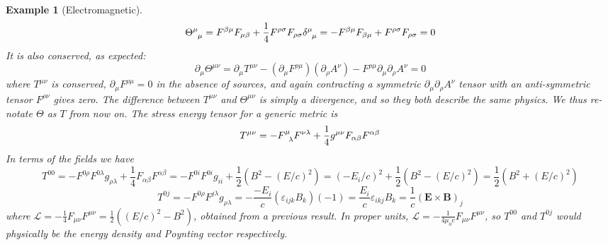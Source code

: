 \documentclass[a4paper]{article}
\newtheorem{eg}{Example}[section]
\theoremstyle{new}
\begin{document}
\begin{eg}[Electromagnetic]
$$\tensor*{\Theta}{*_{}^{\mu}_{\mu}}=F^{\beta\mu}F_{\mu\beta}+\frac{1}{4}F^{\rho\sigma}F_{\rho\sigma}\tensor*{\delta}{*_{}^{\mu}_{\mu}}=-F^{\beta\mu}F_{\beta\mu}+F^{\rho\sigma}F_{\rho\sigma}=0$$
It is also conserved, as expected:
$$\partial_\mu\Theta^{\mu\nu}=\partial_\mu T^{\mu\nu}-(\partial_\mu F^{\rho\mu})(\partial_\rho A^\nu)-F^{\rho\mu}\partial_\mu\partial_\rho A^\nu=0$$
where $T^{\mu\nu}$ is conserved, $\partial_\mu F^{\rho\mu}=0$ in the absence of sources, and again contracting a symmetric $\partial_\mu\partial_\rho A^\nu$ tensor with an anti-symmetric tensor $F^{\rho\nu}$ gives zero. The difference between $T^{\mu\nu}$ and $\Theta^{\mu\nu}$ is simply a divergence, and so they both describe the same physics. We thus re-notate $\Theta$ as $T$ from now on. The stress energy tensor for a generic metric is
$$T^{\mu\nu}=-\tensor*{F}{*_{}^{\mu}_{\lambda}}F^{\nu\lambda}+\frac{1}{4}g^{\mu\nu}F_{\alpha\beta}F^{\alpha\beta}$$
In terms of the fields we have
$$T^{00}=-F^{0\rho}F^{0\lambda}g_{\rho\lambda}+\frac{1}{4}F_{\alpha\beta}F^{\alpha\beta}=-F^{0i}F^{0i}g_{ii}+\frac{1}{2}(B^2-(E/c)^2)=(-E_i/c)^2+\frac{1}{2}(B^2-(E/c)^2)=\frac{1}{2}(B^2+(E/c)^2)$$ $$T^{0j}=-F^{0\rho}F^{j\lambda}g_{\rho\lambda}=-\frac{-E_i}{c}(\varepsilon_{ijk}B_k)(-1)=\frac{E_i}{c}\varepsilon_{ikj}B_k=\frac{1}{c}(\mathbf{E}\times\mathbf{B})_j$$
where $\mathcal{L}=-\frac{1}{4}F_{\mu\nu}F^{\mu\nu}=\frac{1}{2}((E/c)^2-B^2)$, obtained from a previous result. In proper units, $\mathcal{L}=-\frac{1}{4\mu_0c}F_{\mu\nu}F^{\mu\nu}$, so $T^{00}$ and $T^{0j}$ would physically be the energy density and Poynting vector respectively.
\end{eg}
\newpage
\end{document}
